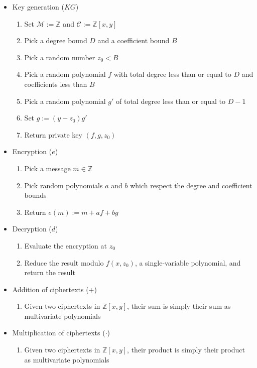 \documentclass[11pt]{report}
\newcommand{\Z}{\mathbb{Z}}
\newcommand{\M}{\mathcal{M}}
\newcommand{\Zxy}{\mathbb{Z}[x,y]}
\begin{document}
\begin{itemize}
\item Key generation ($KG$)
\begin{enumerate}
\item Set $\M := \Z$ and $\mathcal{C} := \Zxy$
\item Pick a degree bound $D$ and a coefficient bound $B$
\item Pick a random number $z_0 < B$
\item Pick a random polynomial $f$ with total degree less than or equal to $D$ and coefficients less than $B$
\item Pick a random polynomial $g'$ of total degree less than or equal to $D-1$
\item Set $g := (y-z_0)g'$
\item Return private key $(f,g,z_0)$
\end{enumerate}

\item Encryption ($e$)
\begin{enumerate}
\item Pick a message $m\in \Z$
\item Pick random polynomials $a$ and $b$ which respect the degree and coefficient bounds
\item Return $e(m) := m+af+bg$
\end{enumerate}

\item Decryption ($d$)
\begin{enumerate}
\item Evaluate the encryption at $z_0$
\item Reduce the result modulo $f(x,z_0)$, a single-variable polynomial, and return the result
\end{enumerate}

\item Addition of ciphertexts ($+$)
\begin{enumerate}
\item Given two ciphertexts in $\Zxy$, their sum is simply their sum as multivariate polynomials
\end{enumerate}

\item Multiplication of ciphertexts ($\cdot$)
\begin{enumerate}
\item Given two ciphertexts in $\Zxy$, their product is simply their product as multivariate polynomials
\end{enumerate}
\end{itemize}
\end{document}

